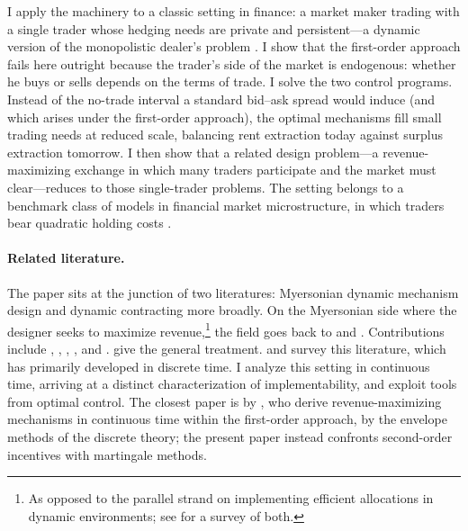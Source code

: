 \documentclass[12pt]{article}
\begin{document}
I apply the machinery to a classic setting in finance: a market maker trading
with a single trader whose hedging needs are private and persistent---a
dynamic version of the monopolistic dealer's problem
\citep{glosten1989insider}. I show that the first-order approach fails here outright
because the trader's side of the market is endogenous: whether he buys or sells
depends on the terms of trade. I solve the two control programs. Instead of the no-trade
interval a standard bid--ask spread would induce (and which arises under the first-order approach), the optimal mechanisms fill small
trading needs at reduced scale, balancing rent extraction today against surplus
extraction tomorrow. I then show that
a related design problem---a revenue-maximizing exchange in which many
traders participate and the market must clear---reduces to those
single-trader problems. The setting
belongs to a benchmark class of models in financial market microstructure, in
which traders bear quadratic holding costs
\citep[e.g.,][]{du2017optimal,malamud2017decentralized,chen2021fragmentation,antill2021augmenting}.




\paragraph{Related literature.}

The paper sits at the junction of two literatures: Myersonian dynamic mechanism
design and dynamic contracting more broadly. On the Myersonian side where the designer seeks to maximize revenue,\footnote{As opposed to the parallel strand on implementing efficient
allocations in dynamic environments; see \citet{bergemann2019introduction} for a
survey of both.} the field goes back to \citet{baron1984regulation} and
\citet{besanko1985multiperiod}. Contributions include \citet{courty2000sequential},
\citet{battaglini2005longterm}, \citet{eso2007optimal},
\citet{krahmer2011procurement}, and \citet{boleslavsky2013progressive}. \citet{pavan2014dynamic} give the general
treatment. \citet{pavan2017dynamic} and \citet{bergemann2019introduction} survey
this literature, which has primarily developed in discrete time.
I analyze this setting in continuous time, arriving at a distinct
characterization of implementability, and exploit tools from optimal control.
The closest paper is by \citet{bergemann2015dynamic},
who derive revenue-maximizing mechanisms in continuous time within the
first-order approach, by the envelope methods of the discrete theory; the present
paper instead confronts second-order incentives with martingale methods.
\end{document}
